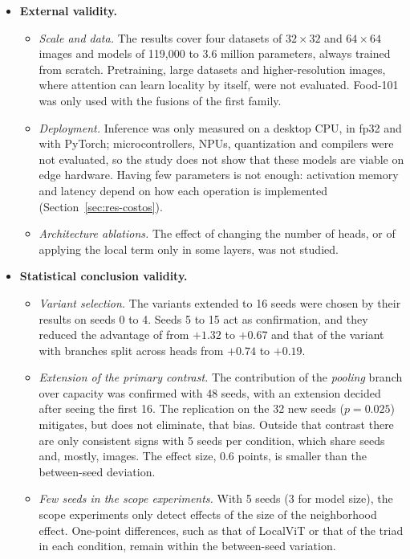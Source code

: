 \begin{itemize}
\begin{itemize}
  \end{itemize}
  \item \textbf{External validity.}
  \begin{itemize}
    \item \emph{Scale and data.} The results cover four datasets of $32\times32$ and $64\times64$ images and models of 119,000 to 3.6 million parameters, always trained from scratch. Pretraining, large datasets and higher-resolution images, where attention can learn locality by itself, were not evaluated. Food-101 was only used with the fusions of the first family.
    \item \emph{Deployment.} Inference was only measured on a desktop CPU, in fp32 and with PyTorch; microcontrollers, NPUs, quantization and compilers were not evaluated, so the study does not show that these models are viable on edge hardware. Having few parameters is not enough: activation memory and latency depend on how each operation is implemented (Section~\ref{sec:res-costos}).
    \item \emph{Architecture ablations.} The effect of changing the number of heads, or of applying the local term only in some layers, was not studied.
  \end{itemize}
  \item \textbf{Statistical conclusion validity.}
  \begin{itemize}
    \item \emph{Variant selection.} The variants extended to 16 seeds were chosen by their results on seeds 0 to 4. Seeds 5 to 15 act as confirmation, and they reduced the advantage of  from $+1.32$ to $+0.67$ and that of the variant with branches split across heads from $+0.74$ to $+0.19$.
    \item \emph{Extension of the primary contrast.} The contribution of the \emph{pooling} branch over capacity was confirmed with 48 seeds, with an extension decided after seeing the first 16. The replication on the 32 new seeds ($p=0.025$) mitigates, but does not eliminate, that bias. Outside that contrast there are only consistent signs with 5 seeds per condition, which share seeds and, mostly, images. The effect size, 0.6 points, is smaller than the between-seed deviation.
    \item \emph{Few seeds in the scope experiments.} With 5 seeds (3 for model size), the scope experiments only detect effects of the size of the neighborhood effect. One-point differences, such as that of LocalViT or that of the triad in each condition, remain within the between-seed variation.
  \end{itemize}
\end{itemize}
